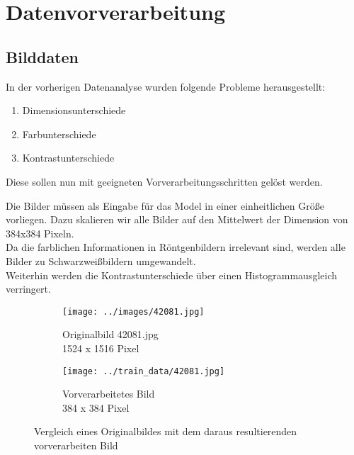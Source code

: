 \chapter{Datenvorverarbeitung}
\label{ch:data_preprocessing}

\section{Bilddaten}

In der vorherigen Datenanalyse wurden folgende Probleme herausgestellt:

\begin{enumerate}
	\item{Dimensionsunterschiede}
	\item{Farbunterschiede}
	\item{Kontrastunterschiede}
\end{enumerate}

Diese sollen nun mit geeigneten Vorverarbeitungsschritten gelöst werden.

Die Bilder müssen als Eingabe für das Model in einer einheitlichen Größe vorliegen. Dazu skalieren wir alle Bilder auf den Mittelwert der Dimension von 384x384 Pixeln.\\
Da die farblichen Informationen in Röntgenbildern irrelevant sind, werden alle Bilder zu Schwarzweißbildern umgewandelt.\\
Weiterhin werden die Kontrastunterschiede über einen Histogrammausgleich verringert.

\begin{figure}[H]
	\centering
	\begin{subfigure}[b]{0.45\textwidth}
		\texttt{[image: ../images/42081.jpg]}
		\caption{Originalbild 42081.jpg\\1524 x 1516 Pixel}
	\end{subfigure} \hfill
	\begin{subfigure}[b]{0.45\textwidth}
		\texttt{[image: ../train\_data/42081.jpg]}
		\caption{Vorverarbeitetes Bild\\384 x 384 Pixel}
	\end{subfigure}
	\caption{Vergleich eines Originalbildes mit dem daraus resultierenden vorverarbeiten Bild}
\end{figure}